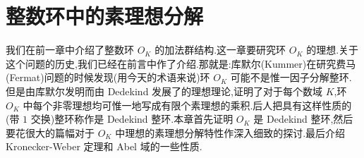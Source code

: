 \chapter{整数环中的素理想分解}\label{ch:2}

我们在前一章中介绍了整数环 $O_K$ 的加法群结构.这一章要研究环 $O_K$ 的理想.关于这个问题的历史,我们已经在前言中作了介绍.那就是:库默尔(Kummer)在研究费马(Fermat)问题的时候发现(用今天的术语来说)环 $O_K$ 可能不是惟一因子分解整环.但是由库默尔发明而由 Dedekind 发展了的理想理论,证明了对于每个数域 $K$,环 $O_K$ 中每个非零理想均可惟一地写成有限个素理想的乘积.后人把具有这样性质的(带 $1$ 交换)整环称作是 Dedekind 整环.本章首先证明 $O_K$ 是 Dedekind 整环,然后要花很大的篇幅对于 $O_K$ 中理想的素理想分解特性作深入细致的探讨.最后介绍 Kronecker-Weber 定理和 Abel 域的一些性质.





